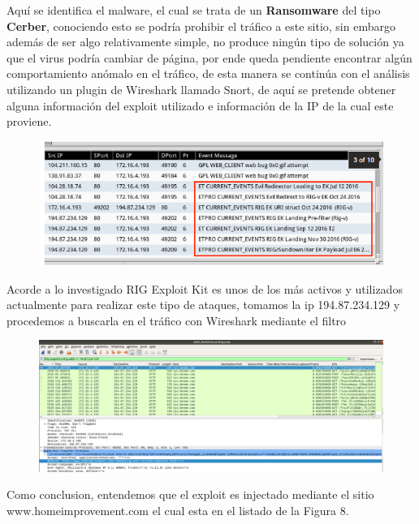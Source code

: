 \documentclass[a4paper,10pt]{article}
\begin{document}
\medskip

Aquí se identifica el malware, el cual se trata de un \textbf{Ransomware}
 del tipo \textbf{Cerber}, conociendo esto se podría prohibir el tráfico a este sitio, sin embargo además de ser algo relativamente simple, no produce ningún tipo de solución ya que el virus podría cambiar de página, por ende queda pendiente encontrar algún comportamiento anómalo en el tráfico, de esta manera se continúa con el análisis utilizando un plugin de Wireshark llamado Snort, de aquí se pretende obtener alguna información del exploit utilizado e información de la IP de la cual este proviene.

\medskip
\begin{figure}[!htp]
\centering
\includegraphics[scale=0.5]{Wireshark/Snort.png} 
\caption{}
\end{figure}
Acorde a lo investigado RIG Exploit Kit es unos de los más activos y utilizados actualmente para realizar este tipo de ataques, tomamos la ip 194.87.234.129 y procedemos a buscarla en el tráfico con Wireshark mediante el filtro
\medskip
\begin{figure}[!htp]
\centering
\includegraphics[scale=0.3]{Wireshark/5.png} 
\caption{}
\end{figure}


\medskip

\newpage
Como conclusion, entendemos que el exploit es injectado mediante el sitio www.homeimprovement.com el cual esta en el listado de la Figura 8.

\medskip
\end{document}
